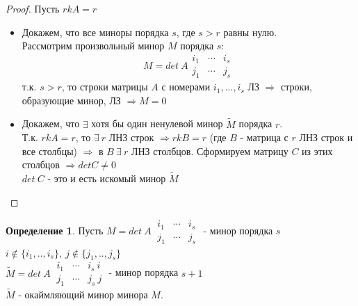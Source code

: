 \documentclass[a4paper, 12pt]{article}
\theoremstyle{definition}
\newtheorem*{definition}{Определение}
\begin{document}
  \begin{proof}
    Пусть $rkA = r$ 
    \begin{itemize}
      \item Докажем, что все миноры порядка $s$, где $s>r$ равны нулю. \\
      Рассмотрим произвольный минор $M$ порядка $s$: $$M = det \ A \begin{matrix}
        i_1 & \cdots & i_s \\
        j_1 & \cdots & j_s
      \end{matrix}$$ 
      т.к. $s>r$, то строки матрицы $A$ с номерами $i_1,...,i_s$ ЛЗ $\Longrightarrow $ строки, образующие минор, ЛЗ $\Longrightarrow M=0$ 
      \item Докажем, что $\exists$ хотя бы один ненулевой минор $\widetilde{M}$ порядка $r$. \\
      Т.к. $rkA = r$, то $\exists \ r$ ЛНЗ строк $\Longrightarrow rkB = r $ (где $B$  - матрица с $r$  ЛНЗ строк и все столбцы) $ \Longrightarrow $ в $B \ \exists \ r $ ЛНЗ столбцов. Сформируем матрицу $C$ из этих столбцов $\Longrightarrow detC \not = 0$ \\
      $det \ C$ - это и есть искомый минор $\widetilde{M}$     
    \end{itemize}
  \end{proof} 
  \begin{definition}
     Пусть $M = det \ A \ \begin{matrix}
      i_1 & \cdots & i_s \\
      j_1 & \cdots & j_s
    \end{matrix}$ - минор порядка $s$ \\
    $i \not \in \{i_1,..,i_s\}, \ j \not \in \{j_1,..,j_s\}$ \vspace{0.3cm}\\
    $\widetilde{M} = det\ A \ \begin{matrix}
      i_1 & \cdots & i_s \ i \\
      j_1 & \cdots & j_s \ j
    \end{matrix}$ - минор порядка  $s+1$ \\
    $\widetilde{M}$ - окаймляющий минор минора $M$.  
  \end{definition} 
\end{document}
